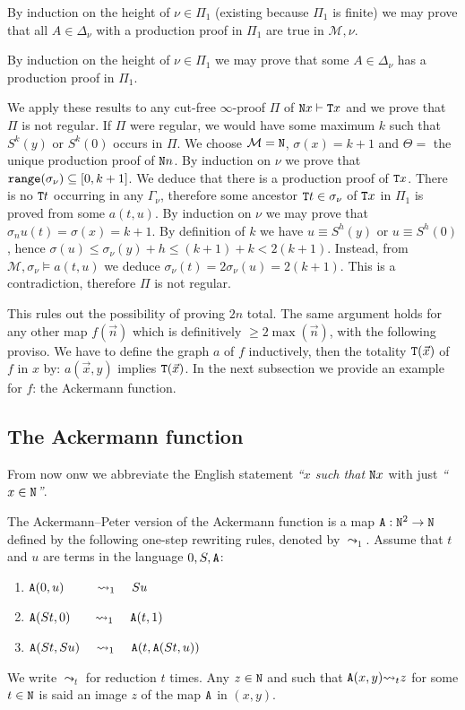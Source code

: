 \documentclass[a4paper,12pt]{article}
\newcommand{\setM}              { {\mathcal M} }
\newcommand{\Nat}               { {\tt N}  }
\newcommand{\reduces}         { {\leadsto} }
\newcommand{\range}           { {\tt range} }
\newcommand{\Tot}           { {\tt T} }
\newcommand{\Ack}   {{\tt A}}
\begin{document}
By induction on the height of $\nu \in \Pi_1$ (existing because $\Pi_1$ is finite) we may prove that all $A \in \Delta_\nu$ with a production proof in $\Pi_1$ are true in $\setM, \nu$. 

By induction on the height of $\nu \in \Pi_1$ we may prove that some $A \in \Delta_\nu$ has a production proof in $\Pi_1$.

We apply these results to any cut-free $\infty$-proof $\Pi$ of $\Nat x \vdash \Tot x$ and we prove that $\Pi$ is not regular. If $\Pi$ were regular, we would have some maximum $k$ such that $S^k(y)$ or $S^k(0)$ occurs in $\Pi$. We choose $\setM = \Nat$, $\sigma(x) = k+1$ and $\Theta = $ the unique production proof of $\Nat n$. By induction on $\nu$ we prove that $\range(\sigma_\nu) \subseteq [0,k+1]$. We deduce that there is a production proof of $\Tot x$. There is no $\Tot t$ occurring in any $\Gamma_\nu$, therefore some ancestor $\Tot t \in \sigma_\nu$ of $\Tot x$ in $\Pi_1$ is proved from some $a(t,u)$. By induction on $\nu$ we may prove that $\sigma_nu(t) = \sigma(x) = k+1$. By definition of $k$ we have $u \equiv S^h(y)$ or $u \equiv S^h(0)$, hence $\sigma(u) \le \sigma_\nu(y) + h \le (k+1) + k < 2(k+1)$. Instead, from $\setM, \sigma_\nu \models a(t,u)$ we deduce $\sigma_\nu(t) = 2\sigma_\nu(u) = 2(k+1)$. This is a contradiction, therefore $\Pi$ is not regular. 

This rules out the possibility of proving $2n$ total. The same argument holds for any other map $f(\vec{n})$ which is definitively $\ge 2 \max(\vec{n})$, with the following proviso. We have to define the graph $a$ of $f$ inductively, then the totality $\Tot(\vec{x})$ of $f$ in $x$ by: $a(\vec{x},y)$ implies $\Tot(\vec{x})$. In the next subsection we provide an example for $f$: the Ackermann function.




\newpage

\subsection{The Ackermann function}
\label{subsection-ackermann}
From now onw we abbreviate the English statement \emph{``$x$ such that $\Nat x$} with  just
\emph{``$x \in \Nat$''}.

The Ackermann–Peter version of the Ackermann function is a map $\Ack:\Nat^2 \rightarrow 
\Nat$ defined by the following one-step rewriting rules, denoted by  $\reduces_1$. 
Assume that $t$ and $u$ are terms in the language $0,S,\Ack$:
\begin{enumerate}
\item
$\Ack(0,u) \ \ \ \ \ \ \ \ \reduces_1 \ \ \ \ Su$ 
\item
$\Ack(St,0)  \ \ \ \ \ \  \reduces_1 \ \ \ \ \Ack(t,1)$
\item
$\Ack(St,Su) \ \ \ \ \reduces_1 \ \ \ \ \Ack(t,\Ack(St,u))$
\end{enumerate}
We write $\reduces_t$ for reduction $t$ times. Any $z \in \Nat$
and such that $\Ack(x,y) \reduces_t z$ for some $t \in \Nat$ is said an image $z$ of 
the map $\Ack$ in $(x,y)$.
\end{document}
